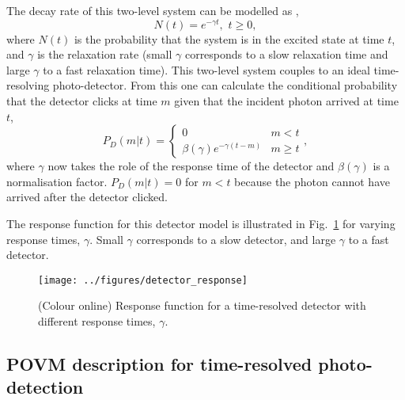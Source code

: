\documentclass[aps,pra,twocolumn,amsmath,amssymb,color,superscriptaddress]{revtex4}
\begin{document}
The decay rate of this two-level system can be modelled as \cite{bib:loudon2000quantum},
\begin{equation}
N(t)=e^{-\gamma t}, \,\, t\geq 0,
\end{equation}
where $N(t)$ is the probability that the system is in the excited state at time $t$, and $\gamma$ is the relaxation rate (small $\gamma$ corresponds to a slow relaxation time and large $\gamma$ to a fast relaxation time). This two-level system couples to an ideal time-resolving photo-detector. From this one can calculate the conditional probability that the detector clicks at time $m$ given that the incident photon arrived at time $t$,
\begin{equation}
   P_D(m|t)=  \left\{
     \begin{array}{lr}
       0 & m < t \\
       \beta(\gamma) e^{-\gamma(t-m)} & m \geq t
     \end{array},
   \right.
\end{equation}
where $\gamma$ now takes the role of the response time of the detector and $\beta(\gamma)$ is a normalisation factor. \mbox{$P_D(m|t)=0$} for \mbox{$m<t$} because the photon cannot have arrived after the detector clicked. 

The response function for this detector model is illustrated in Fig.~\ref{fig:detector_response} for varying response times, $\gamma$. Small $\gamma$ corresponds to a slow detector, and large $\gamma$ to a fast detector.
\begin{figure}[!htb]
\texttt{[image: ../figures/detector\_response]}
\caption{(Colour online) Response function for a time-resolved detector with different response times, $\gamma$.} \label{fig:detector_response}
\end{figure}

%
%

\subsection{POVM description for time-resolved photo-detection}
\end{document}
